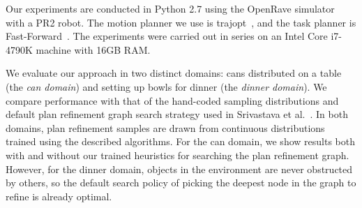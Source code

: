 \begin{table}
  \centering
  \vspace{8pt}
  \caption{Percent solved and standard deviation, along with time spent motion planning and number of calls to the motion
planner for the baseline system (B), our system with only learned refinement policies (no graph search heuristics) (L),
and our full system (F). Results using our system are averaged across 10 independently trained sets of weights. Time limit: 300s.}
  \label{table:results}
\end{table}

Our experiments are conducted in Python 2.7 using the OpenRave simulator~\cite{Diankov_2008_6117} with a PR2 robot.
The motion planner we use is trajopt~\cite{schulman2013finding}, and the task planner is Fast-Forward~\cite{FF}.
The experiments were carried out in series on an Intel Core i7-4790K machine with 16GB RAM.

We evaluate our approach in two distinct domains: cans distributed on a table (the \emph{can domain})
and setting up bowls for dinner (the \emph{dinner domain}).
We compare performance with that of the hand-coded sampling distributions and default plan refinement graph search
strategy used in Srivastava et al.~\cite{srivastava2014combined}. In both domains, plan refinement samples
are drawn from continuous distributions trained using the described algorithms. For the can domain, we
show results both with and without our trained heuristics for searching the plan refinement graph. However,
for the dinner domain, objects in the environment are never obstructed by others, so the default search policy
of picking the deepest node in the graph to refine is already optimal.


